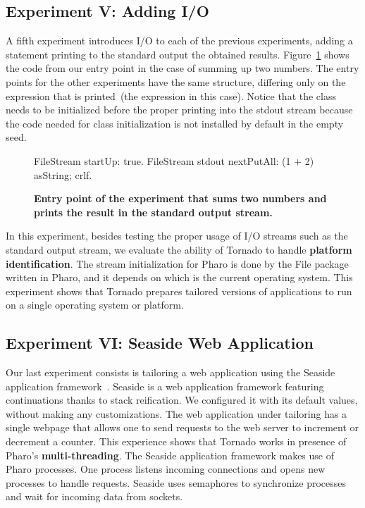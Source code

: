\subsection*{Experiment V: Adding I/O} \label{sec:results_helloworld}

A fifth experiment introduces I/O to each of the previous experiments, adding a statement printing to the standard output the obtained results. Figure~\ref{fig:hello_world_entry_point} shows the code from our entry point in the case of summing up two numbers. The entry points for the other experiments have the same structure, differing only on the expression that is printed~(the  expression in this case). Notice that the  class needs to be initialized before the proper printing into the stdout stream because the code needed for class initialization is not installed by default in the empty seed.

\begin{figure}[ht]

\begin{code}
FileStream startUp: true.
FileStream stdout 
	nextPutAll: (1 + 2) asString;
	crlf.
\end{code}
\caption{ \textbf{Entry point of the experiment that sums two numbers and prints the result in the standard output stream.}\label{fig:hello_world_entry_point}}
\end{figure}

In this experiment, besides testing the proper usage of I/O streams such as the standard output stream, we evaluate the ability of Tornado to handle \textbf{platform identification}. The  stream initialization for Pharo is done by the File package written in Pharo, and it depends on which is the current operating system. This experiment shows that Tornado prepares tailored versions of applications to run on a single operating system or platform.

\subsection*{Experiment VI: Seaside Web Application}



Our last experiment consists is tailoring a web application using the Seaside application framework~\cite{Duca07a}. Seaside is a web application framework featuring continuations thanks to stack reification. We configured it with its default values, without making any customizations. The web application under tailoring has a single webpage that allows one to send requests to the web server to increment or decrement a counter. This experience shows that Tornado works in presence of Pharo's \textbf{multi-threading}. The Seaside application framework makes use of Pharo processes. One process listens incoming connections and opens new processes to handle requests. Seaside uses semaphores to synchronize processes and wait for incoming data from sockets.

